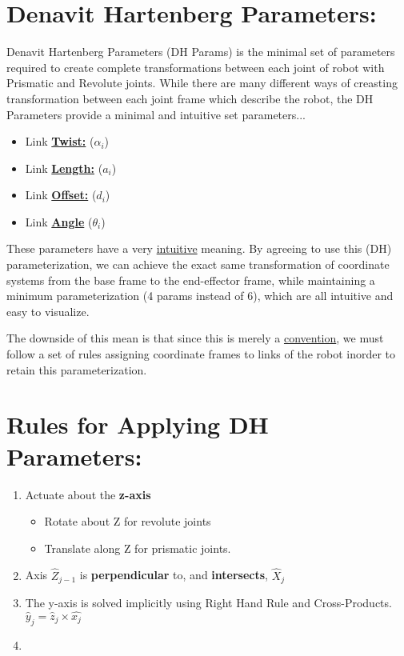 \documentclass[12px]{article}
\begin{document}
\section*{Denavit Hartenberg Parameters:}

Denavit Hartenberg Parameters (DH Params) is the minimal set of parameters required to create complete transformations between each joint of robot with Prismatic and Revolute joints. While there are many different ways of creasting transformation between each joint frame which describe the robot, the DH Parameters provide a minimal and intuitive set parameters...

\begin{itemize}
    \item Link \underline{\textbf{Twist:}} ($\alpha_i$)
    \item Link \underline{\textbf{Length:}} ($a_i$)
    \item Link \underline{\textbf{Offset:}} ($d_i$)
    \item Link \underline{\textbf{Angle}} ($\theta_i$)
\end{itemize}

\noindent These parameters have a very \underline{intuitive} meaning. By agreeing to use this (DH) parameterization, we can achieve the exact same transformation of coordinate systems from the base frame to the end-effector frame, while maintaining a minimum parameterization (4 params instead of 6), which are all intuitive and easy to visualize.

\noindent The downside of this mean is that since this is merely a \underline{convention}, we must follow a set of rules assigning coordinate frames to links of the robot inorder to retain this parameterization.


\section*{Rules for Applying DH Parameters:}


\begin{enumerate}
    \item Actuate about the \textbf{z-axis}
    \begin{itemize}
        \item Rotate about Z for revolute joints
        \item Translate along Z for prismatic joints.
    \end{itemize}

    \item Axis $\hat{Z}_{j-1} $ is \textbf{perpendicular} to, and \textbf{intersects}, $\hat{X}_{j}$

    \item The y-axis is solved implicitly using Right Hand Rule and Cross-Products. $\hat{y}_j = \hat{z}_j \times \hat{x_j}$

    \item

\end{enumerate}
\end{document}
